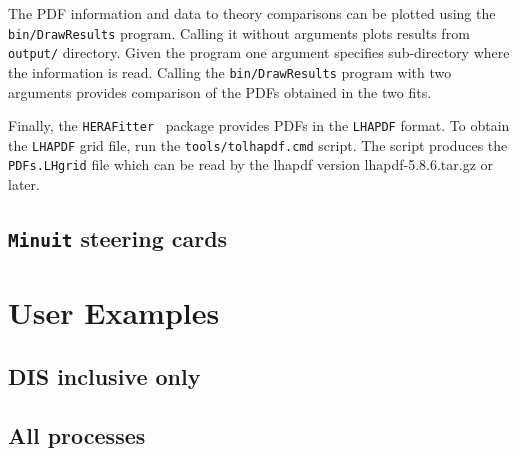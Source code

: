 \documentclass[11pt,a4paper]{article}
\newcommand\fitter{ \mbox{\tt HERAFitter} }
\begin{document}
  The PDF information and data to theory comparisons can be plotted using 
  the {\tt bin/DrawResults} program.  Calling it without arguments plots results from
  {\tt output/} directory. Given the program one argument specifies sub-directory 
  where the information is read. Calling the {\tt bin/DrawResults} program with two
  arguments provides comparison of the PDFs obtained in the two fits.
  
  Finally, the \fitter\ package provides PDFs in the {\tt LHAPDF} format. To obtain the
  {\tt LHAPDF} grid file, run the {\tt tools/tolhapdf.cmd} script. The script produces 
  the {\tt PDFs.LHgrid} file which can be read by the lhapdf version lhapdf-5.8.6.tar.gz
  or later.
\subsection{{\tt Minuit} steering cards}

\section{User Examples}
\subsection{DIS inclusive only}

\subsection{All processes}



\appendix
\end{document}
